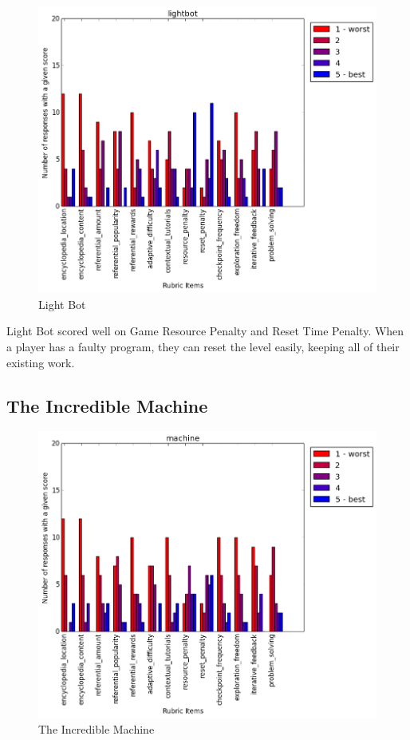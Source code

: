 				\begin{figure}[] 
				\centering 
				\includegraphics[width=\textwidth, height=.4\textheight, keepaspectratio=true]{lightbot_scores.png} 
				\caption{Light Bot}
				\end{figure}

				Light Bot scored well on Game Resource Penalty and Reset Time Penalty. When a player has a faulty program, they can reset the level easily, keeping all of their existing work.

			\subsection{The Incredible Machine}

				\begin{figure}[] 
				\centering 
				\includegraphics[width=\textwidth, height=.4\textheight, keepaspectratio=true]{machine_scores.png} 
				\caption{The Incredible Machine}
				\end{figure}


